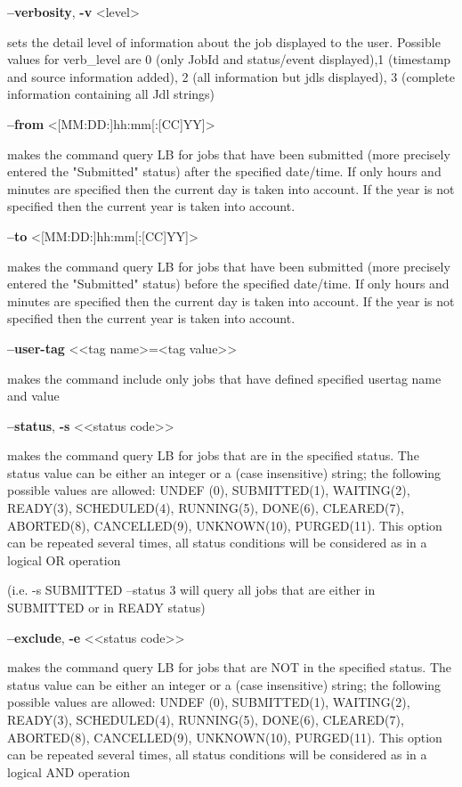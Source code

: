 {\textbf{--verbosity}, \textbf{-v} <level>

sets the detail level of information about the job displayed to the user. Possible values for verb\_level are 0 (only JobId and status/event displayed),1 (timestamp and source information added), 2 (all information but jdls displayed), 3 (complete information containing all Jdl strings)

\textbf{--from} <[MM:DD:]hh:mm[:[CC]YY]>

makes the command query LB for jobs that have been submitted (more precisely entered the "Submitted" status) after the specified date/time.
If only hours and minutes are specified then the current day is taken into account. If the year is not specified then the current year is taken into account.

\textbf{--to} <[MM:DD:]hh:mm[:[CC]YY]>

makes the command query LB for jobs that have been submitted (more precisely entered the "Submitted" status) before the specified date/time.
If only hours and minutes are specified then the current day is taken into account.
If the year is not specified then the current year is taken into account.

\textbf{--user-tag} <<tag name>=<tag value>>

makes the command include only jobs that have defined specified usertag name and value

\textbf{--status}, \textbf{-s} <<status code>>

makes the command query LB for jobs that are in the specified status.
The status value can be either an integer or a (case insensitive) string; the following possible values are allowed:
UNDEF (0), SUBMITTED(1), WAITING(2), READY(3), SCHEDULED(4), RUNNING(5), DONE(6), CLEARED(7), ABORTED(8), CANCELLED(9),
UNKNOWN(10), PURGED(11).
This option can be repeated several times, all status conditions will be considered as in a logical OR operation

(i.e.  -s SUBMITTED --status 3  will query all jobs that are either in SUBMITTED or in READY status)

\textbf{--exclude}, \textbf{-e} <<status code>>

makes the command query LB for jobs that are NOT in the specified status.
The status value can be either an integer or a (case insensitive) string; the following possible values are allowed:
UNDEF (0), SUBMITTED(1), WAITING(2), READY(3), SCHEDULED(4), RUNNING(5), DONE(6), CLEARED(7), ABORTED(8), CANCELLED(9),
UNKNOWN(10), PURGED(11).
This option can be repeated several times, all status conditions will be considered as in a logical AND operation

}
